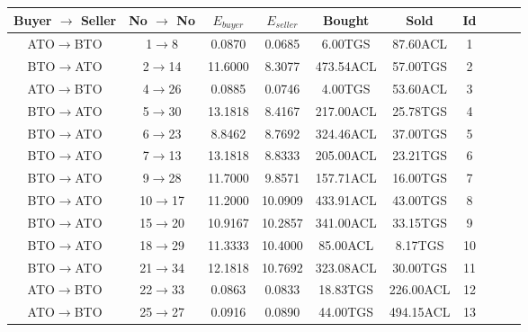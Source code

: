 \begin{tabular}{|c|c|c|c|c|c|c|c|c|c|}
\hline

Buyer $\rightarrow$ Seller & No $\rightarrow$ No & $E_{buyer}$ & $E_{seller}$ & Bought & Sold & Id \\
\hline
ATO$\rightarrow$BTO & 1$\rightarrow$8 & 0.0870 & 0.0685 & 6.00TGS & 87.60ACL & 1 \\
\hline
BTO$\rightarrow$ATO & 2$\rightarrow$14 & 11.6000 & 8.3077 & 473.54ACL & 57.00TGS & 2 \\
\hline
ATO$\rightarrow$BTO & 4$\rightarrow$26 & 0.0885 & 0.0746 & 4.00TGS & 53.60ACL & 3 \\
\hline
BTO$\rightarrow$ATO & 5$\rightarrow$30 & 13.1818 & 8.4167 & 217.00ACL & 25.78TGS & 4 \\
\hline
BTO$\rightarrow$ATO & 6$\rightarrow$23 & 8.8462 & 8.7692 & 324.46ACL & 37.00TGS & 5 \\
\hline
BTO$\rightarrow$ATO & 7$\rightarrow$13 & 13.1818 & 8.8333 & 205.00ACL & 23.21TGS & 6 \\
\hline
BTO$\rightarrow$ATO & 9$\rightarrow$28 & 11.7000 & 9.8571 & 157.71ACL & 16.00TGS & 7 \\
\hline
BTO$\rightarrow$ATO & 10$\rightarrow$17 & 11.2000 & 10.0909 & 433.91ACL & 43.00TGS & 8 \\
\hline
BTO$\rightarrow$ATO & 15$\rightarrow$20 & 10.9167 & 10.2857 & 341.00ACL & 33.15TGS & 9 \\
\hline
BTO$\rightarrow$ATO & 18$\rightarrow$29 & 11.3333 & 10.4000 & 85.00ACL & 8.17TGS & 10 \\
\hline
BTO$\rightarrow$ATO & 21$\rightarrow$34 & 12.1818 & 10.7692 & 323.08ACL & 30.00TGS & 11 \\
\hline
ATO$\rightarrow$BTO & 22$\rightarrow$33 & 0.0863 & 0.0833 & 18.83TGS & 226.00ACL & 12 \\
\hline
ATO$\rightarrow$BTO & 25$\rightarrow$27 & 0.0916 & 0.0890 & 44.00TGS & 494.15ACL & 13 \\
\hline
\end{tabular}
